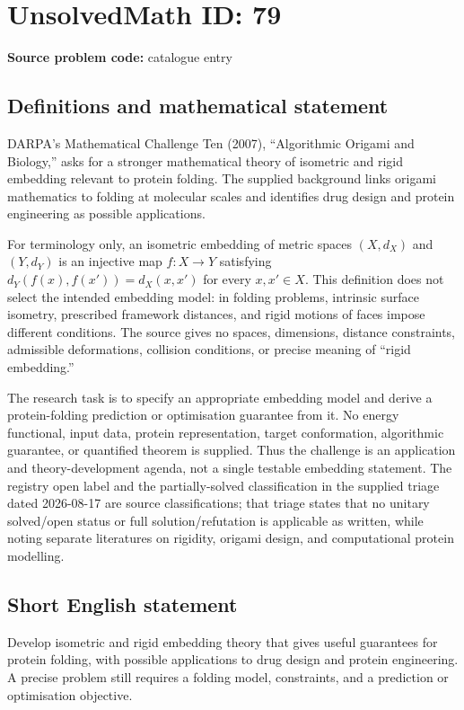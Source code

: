 \documentclass[11pt]{article}
\begin{document}
\section*{UnsolvedMath ID: 79}
\textbf{Source problem code:} catalogue entry
\subsection{Definitions and mathematical statement}
DARPA's Mathematical Challenge Ten (2007), ``Algorithmic Origami and Biology,'' asks for a stronger mathematical theory of isometric and rigid embedding relevant to protein folding. The supplied background links origami mathematics to folding at molecular scales and identifies drug design and protein engineering as possible applications.

For terminology only, an isometric embedding of metric spaces $(X,d_X)$ and $(Y,d_Y)$ is an injective map $f:X\to Y$ satisfying $d_Y(f(x),f(x'))=d_X(x,x')$ for every $x,x'\in X$. This definition does not select the intended embedding model: in folding problems, intrinsic surface isometry, prescribed framework distances, and rigid motions of faces impose different conditions. The source gives no spaces, dimensions, distance constraints, admissible deformations, collision conditions, or precise meaning of ``rigid embedding.''

The research task is to specify an appropriate embedding model and derive a protein-folding prediction or optimisation guarantee from it. No energy functional, input data, protein representation, target conformation, algorithmic guarantee, or quantified theorem is supplied. Thus the challenge is an application and theory-development agenda, not a single testable embedding statement. The registry open label and the partially-solved classification in the supplied triage dated 2026-08-17 are source classifications; that triage states that no unitary solved/open status or full solution/refutation is applicable as written, while noting separate literatures on rigidity, origami design, and computational protein modelling.
\subsection{Short English statement}
Develop isometric and rigid embedding theory that gives useful guarantees for protein folding, with possible applications to drug design and protein engineering. A precise problem still requires a folding model, constraints, and a prediction or optimisation objective.
\end{document}
